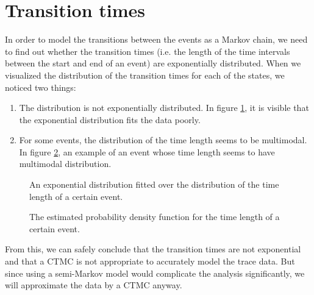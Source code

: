 \section{Transition times}
In order to model the transitions between the events as a Markov chain, we need to find out whether the transition times (i.e. the length of the time intervals between the start and end of an event) are exponentially distributed.
When we visualized the distribution of the transition times for each of the states, we noticed two things:
\begin{enumerate}
	\item The distribution is not exponentially distributed.
	In figure \ref{figure:transitionFit}, it is visible that the exponential distribution fits the data poorly.
	\item For some events, the distribution of the time length seems to be multimodal.
	In figure \ref{figure:transitionBimodal}, an example of an event whose time length seems to have multimodal distribution.
\end{enumerate}
\begin{figure}[H]\label{figure:transitionFit}
\centering
\setlength{}

\caption{An exponential distribution fitted over the distribution of the time length of a certain event.}
\end{figure}
\begin{figure}[H]\label{figure:transitionBimodal}
\centering
\setlength{}

\caption{The estimated probability density function for the time length of a certain event.}
\end{figure}
From this, we can safely conclude that the transition times are not exponential and that a CTMC is not appropriate to accurately model the trace data.
But since using a semi-Markov model would complicate the analysis significantly, we will approximate the data by a CTMC anyway. 
